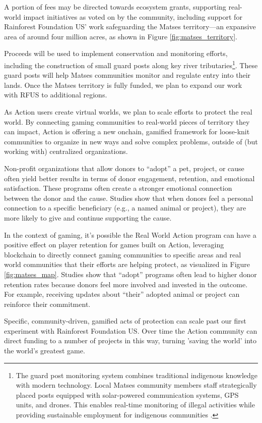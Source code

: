 A portion of fees may be directed towards ecosystem grants, supporting real-world impact initiatives as voted on by the community, including support for Rainforest Foundation US' work safeguarding the Matses territory---an expansive area of around four million acres, as shown in Figure \ref{fig:matses_territory}.

Proceeds will be used to implement conservation and monitoring efforts, including the construction of small guard posts along key river tributaries\footnote{The guard post monitoring system combines traditional indigenous knowledge with modern technology. Local Matses community members staff strategically placed posts equipped with solar-powered communication systems, GPS units, and drones. This enables real-time monitoring of illegal activities while providing sustainable employment for indigenous communities \cite{RFUS2024}.}. These guard posts will help Matses communities monitor and regulate entry into their lands. Once the Matses territory is fully funded, we plan to expand our work with RFUS to additional regions.

As Action users create virtual worlds, we plan to scale efforts to protect the real world. By connecting gaming communities to real-world pieces of territory they can impact, Action is offering a new onchain, gamified framework for loose-knit communities to organize in new ways and solve complex problems, outside of (but working with) centralized organizations.

Non-profit organizations that allow donors to ``adopt'' a pet, project, or cause often yield better results in terms of donor engagement, retention, and emotional satisfaction. These programs often create a stronger emotional connection between the donor and the cause. Studies show that when donors feel a personal connection to a specific beneficiary (e.g., a named animal or project), they are more likely to give and continue supporting the cause. \cite{Small2003}

In the context of gaming, it's possible the Real World Action program can have a positive effect on player retention for games built on Action, leveraging blockchain to directly connect gaming communities to specific areas and real world communities that their efforts are helping protect, as visualized in Figure \ref{fig:matses_map}. Studies show that ``adopt'' programs often lead to higher donor retention rates because donors feel more involved and invested in the outcome. For example, receiving updates about ``their'' adopted animal or project can reinforce their commitment. \cite{Sargeant2004}

Specific, community-driven, gamified acts of protection can scale past our first experiment with Rainforest Foundation US. Over time the Action community can direct funding to a number of projects in this way, turning 'saving the world' into the world's greatest game.

